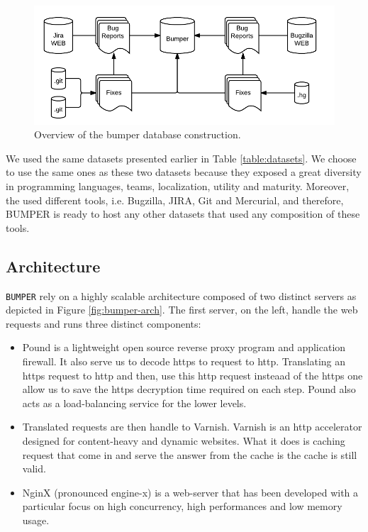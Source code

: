 \begin{figure}[h!]
  \centering
    \includegraphics{media/bumper-approach.png}
    \caption{Overview of the bumper database construction.
    \label{fig:bumper-approach}}
\end{figure}

We used the same datasets presented earlier in Table \ref{table:datasets}.
We choose to use the same ones as these two datasets because they exposed a great diversity in programming languages, teams, localization, utility and maturity. Moreover, the used different tools, i.e. Bugzilla, JIRA, Git and Mercurial, and therefore, BUMPER is ready to host any other datasets that used any composition of these tools.

\subsection{Architecture}

{\tt BUMPER} rely on a highly scalable architecture composed of two distinct servers as depicted in Figure \ref{fig:bumper-arch}. The first server, on the left, handle the web requests and runs three distinct components:

\begin{itemize}
	\item Pound is a lightweight open source reverse proxy program and application firewall.
	It also serve us to decode https to request to http. Translating an https request to http and then, use this http request insteaad of the https one allow us to save the https decryption time required on each step.
	Pound also acts as a load-balancing service for the lower levels.
	\item Translated requests are then handle to Varnish. Varnish is an http accelerator designed for content-heavy and dynamic websites. What it does is caching request that come in and serve the answer from the cache is the cache is still valid.
	\item NginX (pronounced engine-x) is a web-server that has been developed with a particular focus on high concurrency, high performances and low memory usage.
\end{itemize}

